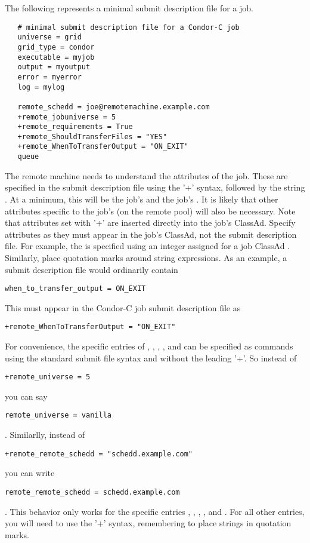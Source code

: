 The following represents a minimal submit description file for
a job.

\footnotesize
\begin{verbatim}
   # minimal submit description file for a Condor-C job
   universe = grid
   grid_type = condor
   executable = myjob
   output = myoutput
   error = myerror
   log = mylog

   remote_schedd = joe@remotemachine.example.com
   +remote_jobuniverse = 5
   +remote_requirements = True
   +remote_ShouldTransferFiles = "YES"
   +remote_WhenToTransferOutput = "ON_EXIT"
   queue
\end{verbatim}
\normalsize

The remote machine needs to understand the attributes of the job.
These are specified in the submit description file using the '+'
syntax, followed by the string .
At a minimum, this will be the job's  and the job's
.
It is likely that other attributes specific to the
job's  (on the remote pool) will also be necessary.
Note that attributes set with '+' are inserted directly into
the job's ClassAd.  
Specify attributes as they 
must appear in the job's ClassAd, not the submit description file. 
For example,
the  is specified using an integer assigned for
a job ClassAd .
Similarly, place quotation marks around string 
expressions.
As an example, a submit description file would ordinarily contain
\footnotesize
\begin{verbatim}
when_to_transfer_output = ON_EXIT
\end{verbatim}
\normalsize
This must appear in the Condor-C job submit description file as
\footnotesize
\begin{verbatim}
+remote_WhenToTransferOutput = "ON_EXIT"
\end{verbatim}
\normalsize

For convenience, the specific entries of 
, 
, 
, 
, and
can be specified as  commands
using the standard submit file syntax and without the
leading '+'.  So instead of 
\footnotesize
\begin{verbatim}
+remote_universe = 5
\end{verbatim}
\normalsize
you can say
\footnotesize
\begin{verbatim}
remote_universe = vanilla
\end{verbatim}
\normalsize
.
Similarlly, instead of
\footnotesize
\begin{verbatim}
+remote_remote_schedd = "schedd.example.com"
\end{verbatim}
\normalsize
you can write
\footnotesize
\begin{verbatim}
remote_remote_schedd = schedd.example.com
\end{verbatim}
\normalsize
.
This behavior only works for the specific entries 
, 
, 
, 
, and
.
For all other entries, you will need to use the '+' syntax,
remembering to place strings in quotation marks.

